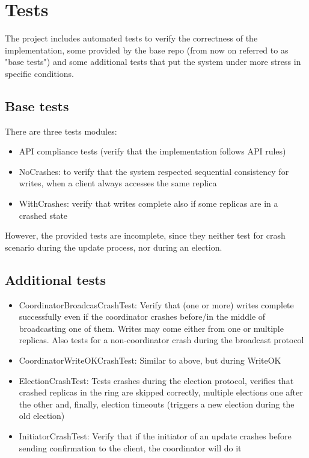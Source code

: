 \section{Tests}

The project includes automated tests to verify the correctness of the implementation, some provided by the base repo (from now on referred to as "base tests") and some additional tests that put the system under more stress in specific conditions.

\subsection{Base tests}

There are three tests modules:
\begin{itemize}
    \item API compliance tests (verify that the implementation follows API rules)
    \item NoCrashes: to verify that the system respected sequential consistency for writes, when a client always accesses the same replica
    \item WithCrashes: verify that writes complete also if some replicas are in a crashed state
\end{itemize}

However, the provided tests are incomplete, since they neither test for crash scenario during the update process, nor during an election.

\subsection{Additional tests}

\begin{itemize}
    \item CoordinatorBroadcasCrashTest: Verify that (one or more) writes complete successfully even if the coordinator crashes before/in the middle of broadcasting one of them. Writes may come either from one or multiple replicas. Also tests for a non-coordinator crash during the broadcast protocol
    \item CoordinatorWriteOKCrashTest: Similar to above, but during WriteOK
    \item ElectionCrashTest: Tests crashes during the election protocol, verifies that crashed replicas in the ring are skipped correctly, multiple elections one after the other and, finally, election timeouts (triggers a new election during the old election)
    \item InitiatorCrashTest: Verify that if the initiator of an update crashes before sending confirmation to the client, the coordinator will do it
\end{itemize}